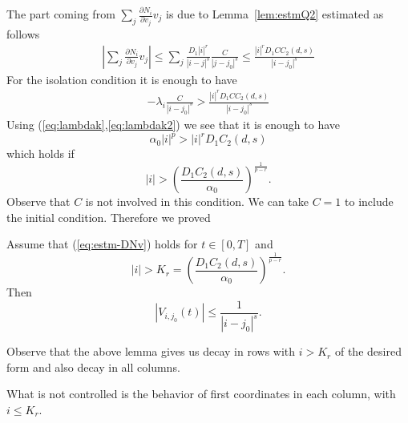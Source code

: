 The part coming from  $\sum_{j} \frac{\partial N_i}{\partial v_j} v_{j}$ is due to Lemma~\ref{lem:estmQ2} estimated as follows
\begin{eqnarray*}
  \left|\sum_{j} \frac{\partial N_i}{\partial v_j} v_{j}  \right| \leq \sum_{j} \frac{D_1 |i|^r}{|i-j|^s} \frac{C}{|j-j_0|^s}  \leq \frac{|i|^rD_1 C C_2(d,s)}{|i-j_0|^s}
\end{eqnarray*}
For the isolation condition it is enough to have
\begin{eqnarray*}
   -\lambda_i \frac{C}{|i-j_0|^s} > \frac{|i|^rD_1 C C_2(d,s)}{|i-j_0|^s}
\end{eqnarray*}
Using (\ref{eq:lambdak},\ref{eq:lambdak2}) we see that it is enough to have
\begin{equation*}
  \alpha_0 |i|^p > |i|^r D_1 C_2(d,s)
\end{equation*}
which holds if 
\begin{equation*}
  |i| > \left(\frac{ D_1 C_2(d,s)}{\alpha_0} \right)^{\frac{1}{p-r}}.
\end{equation*}
Observe that $C$ is not involved in this condition.  We can take $C=1$ to include the initial condition.  Therefore we proved
\begin{lemma}
  Assume that (\ref{eq:estm-DNv}) holds for $t \in [0,T]$ and
  \begin{equation*}
  |i| > K_r=\left(\frac{ D_1 C_2(d,s)}{\alpha_0} \right)^{\frac{1}{p-r}}.
  \end{equation*}
  Then
  \begin{equation*}
      |V_{i,j_0}(t)| \leq \frac{1}{|i-j_0|^s}.
  \end{equation*}
\end{lemma}
Observe that the above lemma gives us decay in rows with $i > K_r$ of the desired form and also decay in all columns.

What is not controlled is the behavior of first coordinates in each column, with $i \leq K_r$. 